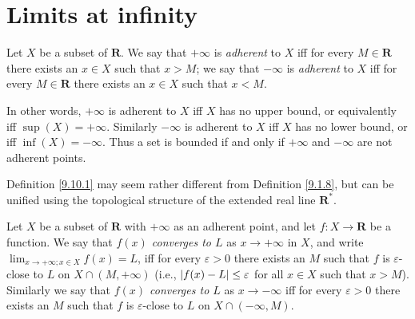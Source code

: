 \section{Limits at infinity}\label{sec 9.10}

\begin{definition}\label{9.10.1}
    Let \(X\) be a subset of \(\mathbf{R}\).
    We say that \(+\infty\) is \emph{adherent} to \(X\) iff for every \(M \in \mathbf{R}\) there exists an \(x \in X\) such that \(x > M\);
    we say that \(-\infty\) is \emph{adherent} to \(X\) iff for every \(M \in \mathbf{R}\) there exists an \(x \in X\) such that \(x < M\).
\end{definition}

\begin{note}
    In other words, \(+\infty\) is adherent to \(X\) iff \(X\) has no upper bound, or equivalently iff \(\sup(X) = +\infty\).
    Similarly \(-\infty\) is adherent to \(X\) iff \(X\) has no lower bound, or iff \(\inf(X) = -\infty\).
    Thus a set is bounded if and only if \(+\infty\) and \(-\infty\) are not adherent points.
\end{note}

\begin{remark}\label{9.10.2}
    Definition \ref{9.10.1} may seem rather different from Definition \ref{9.1.8}, but can be unified using the topological structure of the extended real line \(\mathbf{R}^*\).
\end{remark}

\begin{definition}\label{9.10.3}
    Let \(X\) be a subset of \(\mathbf{R}\) with \(+\infty\) as an adherent point, and let \(f : X \to \mathbf{R}\) be a function.
    We say that \emph{\(f(x)\) converges to \(L\)} as \(x \to +\infty\) in \(X\), and write \(\lim_{x \to +\infty ; x \in X} f(x) = L\), iff for every \(\varepsilon > 0\) there exists an \(M\) such that \(f\) is \(\varepsilon\)-close to \(L\) on \(X \cap (M, +\infty)\)
    (i.e., \(\abs*{f(x) - L} \leq \varepsilon\) for all \(x \in X\) such that \(x > M\)).
    Similarly we say that \emph{\(f(x)\) converges to \(L\)} as \(x \to -\infty\) iff for every \(\varepsilon > 0\) there exists an \(M\) such that \(f\) is \(\varepsilon\)-close to \(L\) on \(X \cap (-\infty, M)\).
\end{definition}
